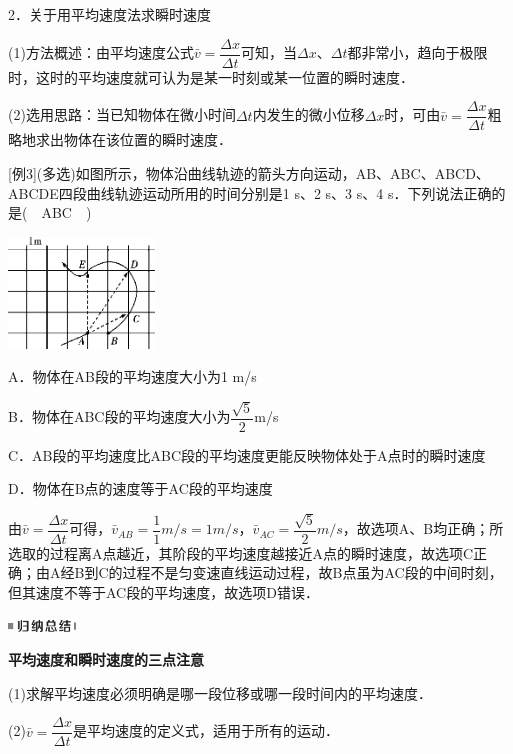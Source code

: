 2．关于用平均速度法求瞬时速度

(1)方法概述：由平均速度公式$\bar v=\dfrac{\Delta x}{\Delta t}$可知，当$\Delta x$、$\Delta t$都非常小，趋向于极限时，这时的平均速度就可认为是某一时刻或某一位置的瞬时速度．

(2)选用思路：当已知物体在微小时间$\Delta t$内发生的微小位移$\Delta x$时，可由$\bar v=\dfrac{\Delta x}{\Delta t}$粗略地求出物体在该位置的瞬时速度．

{[}例3{]}(多选)如图所示，物体沿曲线轨迹的箭头方向运动，AB、ABC、ABCD、ABCDE四段曲线轨迹运动所用的时间分别是1
s、2 s、3 s、4 s．下列说法正确的是(　ABC　)

\begin{center}\includegraphics[width=1.53125in,height=1.16667in]{media/image14.png}\end{center}

A．物体在AB段的平均速度大小为1 m/s

B．物体在ABC段的平均速度大小为$\dfrac{\sqrt{5}}{2}$m/s

C．AB段的平均速度比ABC段的平均速度更能反映物体处于A点时的瞬时速度

D．物体在B点的速度等于AC段的平均速度

\begin{solution}
	由$\bar v=\dfrac{\Delta x}{\Delta t}$可得，$\bar v_{AB}=\dfrac{1}{1}m/s=1m/s$，$\bar v_{AC}=\dfrac{\sqrt{5}}{2}m/s$，故选项A、B均正确；所选取的过程离A点越近，其阶段的平均速度越接近A点的瞬时速度，故选项C正确；由A经B到C的过程不是匀变速直线运动过程，故B点虽为AC段的中间时刻，但其速度不等于AC段的平均速度，故选项D错误．
\end{solution}


\begin{center}\includegraphics[width=0.70833in,height=0.125in]{media/image13.png}

\textbf{平均速度和瞬时速度的三点注意}
\end{center}

(1)求解平均速度必须明确是哪一段位移或哪一段时间内的平均速度．

(2)$\bar v=\dfrac{\Delta x}{\Delta t}$是平均速度的定义式，适用于所有的运动．

